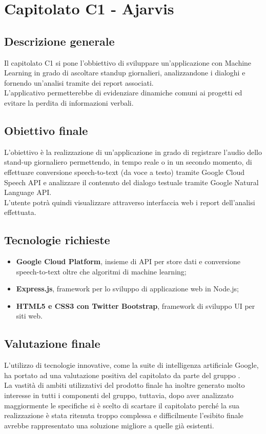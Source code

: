 \documentclass[StudioDiFattibilità.tex]{subfiles}
\begin{document}
	\chapter{Capitolato C1 - Ajarvis}
	\section{Descrizione generale}
	Il capitolato C1 si pone l'obbiettivo di sviluppare un'applicazione con Machine Learning in grado di ascoltare standup giornalieri, analizzandone i dialoghi e fornendo un'analisi tramite dei report associati.\\
	L'applicativo permetterebbe di evidenziare dinamiche comuni ai progetti ed evitare la perdita di informazioni verbali.
	
	\section{Obiettivo finale}
	L'obiettivo è la realizzazione di un'applicazione in grado di registrare l'audio dello stand-up giornaliero permettendo, in tempo reale o in un secondo momento, di effettuare conversione speech-to-text (da voce a testo) tramite Google Cloud Speech API e analizzare il contenuto del dialogo testuale tramite Google Natural Language API.\\
	L'utente potrà quindi visualizzare attraverso interfaccia web i report dell'analisi effettuata. 
	
	\section{Tecnologie richieste}
	\begin{itemize}
		\item \textbf{Google Cloud Platform}, insieme di API per store dati e conversione speech-to-text oltre che algoritmi di machine learning;
		\item \textbf{Express.js}, framework per lo sviluppo di applicazione web in Node.js;
		\item \textbf{HTML5 e CSS3 con Twitter Bootstrap}, framework di sviluppo UI per siti web.
	\end{itemize}
	
	\section{Valutazione finale}
	L'utilizzo di tecnologie innovative, come la suite di intelligenza artificiale Google, ha portato ad una valutazione positiva del capitolato da parte del gruppo \gruppo.\\
	La vastità di ambiti utilizzativi del prodotto finale ha inoltre generato molto interesse in tutti i componenti del gruppo, tuttavia, dopo aver analizzato maggiormente le specifiche si è scelto di scartare il capitolato perché la sua realizzazione è stata ritenuta troppo complessa e difficilmente l'esibito finale avrebbe rappresentato una soluzione migliore a quelle già esistenti.
	
\end{document}
